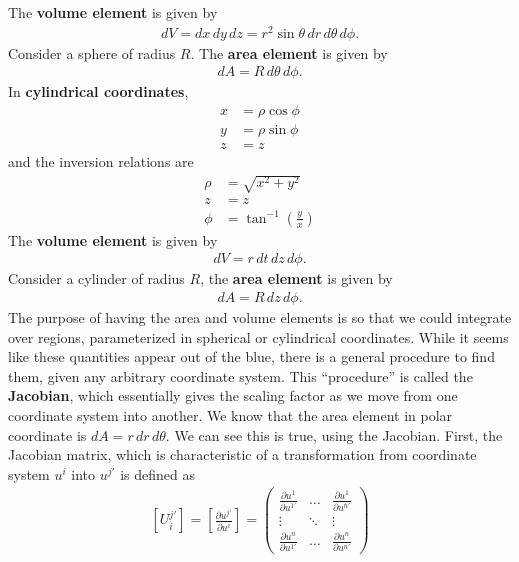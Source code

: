 \documentclass{book}
\theoremstyle{definition}
\begin{document}
The \textbf{volume element} is given by
\begin{align*}
dV = dx\,dy\,dz = r^2\sin\theta\,dr\,d\theta\,d\phi.
\end{align*}
Consider a sphere of radius $R$. The \textbf{area element} is given by
\begin{align*}
dA = R\,d\theta\,d\phi.
\end{align*}
In \textbf{cylindrical coordinates},
\begin{align*}
x &= \rho\cos\phi\\
y &= \rho\sin\phi\\
z &= z
\end{align*}
and the inversion relations are
\begin{align*}
\rho &= \sqrt{x^2+y^2}\\
z &= z\\
\phi &= \tan^{-1}\left(\frac{y}{x}\right) 
\end{align*}
The \textbf{volume element} is given by
\begin{align*}
dV = r\,dt\,dz\,d\phi.
\end{align*}
Consider a cylinder of radius $R$, the \textbf{area element} is given by 
\begin{align*}
dA = R\,dz\,d\phi.
\end{align*}
The purpose of having the area and volume elements is so that we could integrate over regions, parameterized in spherical or cylindrical coordinates. While it seems like these quantities appear out of the blue, there is a general procedure to find them, given any arbitrary coordinate system. This ``procedure'' is called the \textbf{Jacobian}, which essentially gives the scaling factor as we move from one coordinate system into another. We know that the area element in polar coordinate is $dA = r\,dr\,d\theta$. We can see this is true, using the Jacobian. First, the Jacobian matrix, which is characteristic of a transformation from coordinate system $u^i$ into $u^{j'}$ is defined as
\begin{align*}
\boxed{[U^{j'}_{i}] = \left[ \frac{\partial u^{j'}}{\partial u^{i}} \right] = 
\begin{pmatrix}
\frac{\partial u^1}{\partial u^{1'}} & \dots & \frac{\partial u^1}{\partial u^{n'}}\\
\vdots & \ddots & \vdots\\
\frac{\partial u^n}{\partial u^{1'}} & \dots & \frac{\partial u^n}{\partial u^{n'}}
\end{pmatrix}}
\end{align*}
\end{document}
